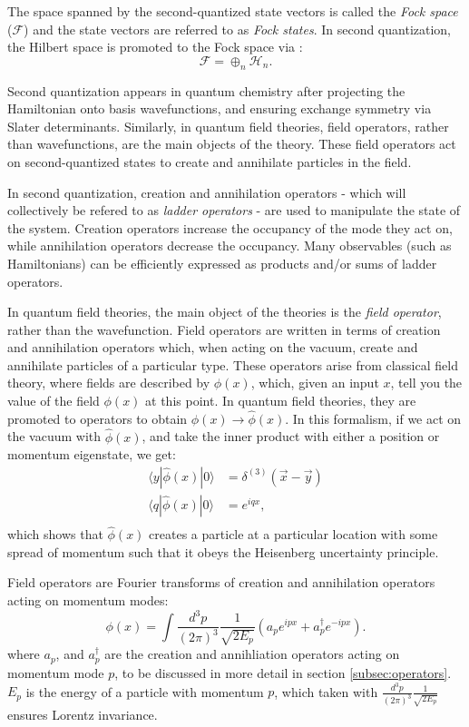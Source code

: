 The space spanned by the second-quantized state vectors is called the \textit{Fock space} ($\mathcal{F}$) and the state vectors are referred to as \textit{Fock states}.
In second quantization, the Hilbert space is promoted to the Fock space via \cite{Schwartz_2013}:
\begin{equation}
    \mathcal{F} = \oplus_n \mathcal{H}_n.
\end{equation}

Second quantization appears in quantum chemistry after projecting the Hamiltonian onto basis wavefunctions, and ensuring exchange symmetry via Slater determinants.
Similarly, in quantum field theories, field operators, rather than wavefunctions, are the main objects of the theory. These field operators act on second-quantized states to create and annihilate particles in the field. 

In second quantization, creation and annihilation operators - which will collectively be refered to as \emph{ladder operators} - are used to manipulate the state of the system.
Creation operators increase the occupancy of the mode they act on, while annihilation operators decrease the occupancy.
Many observables (such as Hamiltonians) can be efficiently expressed as products and/or sums of ladder operators.  

In quantum field theories, the main object of the theories is the \textit{field operator}, rather than the wavefunction. Field operators are written in terms of creation and annihilation operators which, when acting on the vacuum, create and annihilate particles of a particular type. 
These operators arise from classical field theory, where fields are described by $\phi(x)$, which, given an input $x$, tell you the value of the field $\phi(x)$  at this point. In quantum field theories, they are promoted to operators to obtain $\phi(x) \rightarrow \hat{\phi}(x)$.
In this formalism, if we act on the vacuum with $\hat{\phi}(x)$, and take the inner product with either a position or momentum eigenstate, we get:
\begin{align}
    \langle y|\hat{\phi}(x)|0\rangle &= \delta^{(3)}(\vec{x} - \vec{y}) \\ \nonumber
    \langle q|\hat{\phi}(x)|0\rangle &= e^{iqx}, \\
\end{align}
which shows that $\hat{\phi}(x)$ creates a particle at a particular location with some spread of momentum such that it obeys the Heisenberg uncertainty principle.

Field operators are Fourier transforms of creation and annihilation operators acting on momentum modes: 
\begin{equation}
    \phi(x) = \int \frac{d^3p}{(2\pi)^3}\frac{1}{\sqrt{2E_p}}\left(a_p e^{ipx} + a_p^\dagger e^{-ipx}\right).
\end{equation}
where $a_p$, and $a_p^\dagger$ are the creation and annihliation operators acting on momentum mode $p$, to be discussed in more detail in section \ref{subsec:operators}.
$E_p$ is the energy of a particle with momentum $p$, which taken with $\frac{d^3p}{(2\pi)^3}\frac{1}{\sqrt{2E_p}}$ ensures Lorentz invariance. 

